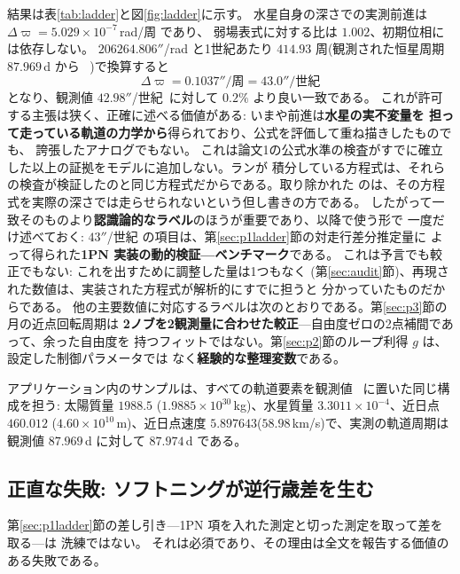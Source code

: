 \documentclass[a4paper,10pt,twocolumn]{ltjsarticle}
\begin{document}
結果は表\ref{tab:ladder}と図\ref{fig:ladder}に示す。
水星自身の深さでの実測前進は $\Delta\varpi=5.029\times10^{-7}$\,rad/周 であり、
弱場表式に対する比は $1.002$、初期位相には依存しない。
$206264.806''$/rad と1世紀あたり $414.93$ 周(観測された恒星周期 $87.969$\,d から
~\cite{NASAFact})で換算すると
\begin{equation}
  \Delta\varpi = 0.1037''/\text{周} = 43.0''/\text{世紀}
  \label{eq:43}
\end{equation}
となり、観測値 $42.98''$/世紀~\cite{Park2017}に対して $0.2\%$ より良い一致である。
これが許可する主張は狭く、正確に述べる価値がある: いまや前進は\textbf{水星の実不変量を
担って走っている軌道の力学から}得られており、公式を評価して重ね描きしたものでも、
誇張したアナログでもない。
これは論文1の公式水準の検査がすでに確立した以上の証拠をモデルに追加しない。ランが
積分している方程式は、それらの検査が検証したのと同じ方程式だからである。取り除かれた
のは、その方程式を実際の深さでは走らせられないという但し書きの方である。
したがって一致そのものより\textbf{認識論的なラベル}のほうが重要であり、以降で使う形で
一度だけ述べておく: $43''$/世紀 の項目は、第\ref{sec:p1ladder}節の対走行差分推定量に
よって得られた\textbf{1PN 実装の動的検証---ベンチマーク}である。
これは予言でも較正でもない: これを出すために調整した量は1つもなく
(第\ref{sec:audit}節)、再現された数値は、実装された方程式が解析的にすでに担うと
分かっていたものだからである。
他の主要数値に対応するラベルは次のとおりである。第\ref{sec:p3}節の月の近点回転周期は
\textbf{2ノブを2観測量に合わせた較正}---自由度ゼロの2点補間であって、余った自由度を
持つフィットではない。第\ref{sec:p2}節のループ利得 $g$ は、設定した制御パラメータでは
なく\textbf{経験的な整理変数}である。

アプリケーション内のサンプルは、すべての軌道要素を観測値
~\cite{Prsa2016,NASAFact}に置いた同じ構成を担う: 太陽質量 $1988.5$
($1.9885\times10^{30}$\,kg)、水星質量 $3.3011\times10^{-4}$、近日点 $460.012$
($4.60\times10^{10}$\,m)、近日点速度 $5.897643$($58.98$\,km/s)で、実測の軌道周期は
観測値 $87.969$\,d に対して $87.974$\,d である。

\subsection{正直な失敗: ソフトニングが逆行歳差を生む}
\label{sec:p1soft}

第\ref{sec:p1ladder}節の差し引き---1PN 項を入れた測定と切った測定を取って差を取る---は
洗練ではない。
それは必須であり、その理由は全文を報告する価値のある失敗である。
\end{document}
